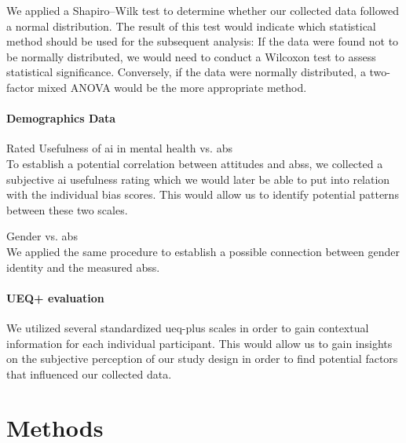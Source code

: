 \documentclass[sigconf,natbib=false]{acmart}
\begin{document}
We applied a Shapiro–Wilk test to determine whether our collected data followed a normal distribution.
The result of this test would indicate which statistical method should be used for the subsequent analysis: 
If the data were found not to be normally distributed, we would need to conduct a Wilcoxon test to assess statistical significance. 
Conversely, if the data were normally distributed, a two-factor mixed ANOVA would be the more appropriate method.


\label{sec:contenxt_data}

\paragraph{Demographics Data}

Rated Usefulness of \Gls{ai} in mental health vs. \acrfull{abs}\\
To establish a potential correlation between attitudes and \glspl{abs}, we collected a subjective \Gls{ai} usefulness rating which we would later be able to put into relation with the individual bias scores. This would allow us to identify potential patterns between these two scales.

Gender vs. \acrfull{abs}\\
We applied the same procedure to establish a possible connection between gender identity and the measured \glspl{abs}.

\paragraph{UEQ+ evaluation}

We utilized several standardized \gls{ueq-plus} scales in order to gain contextual information for each individual  participant. This would allow us to gain insights on the subjective perception of our study design in order to find potential factors that influenced our collected data.















\section {Methods}
\end{document}
